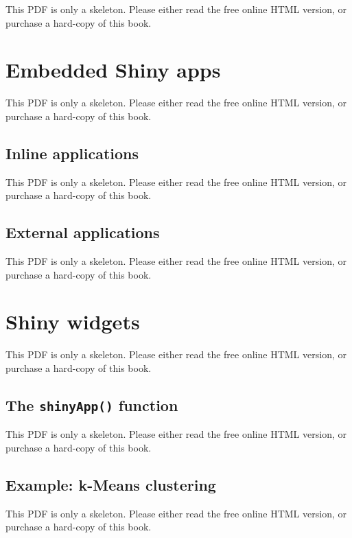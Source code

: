 \documentclass[
  11pt,
]{krantz}
\theoremstyle{definition}
\theoremstyle{definition}
\theoremstyle{definition}
\theoremstyle{definition}
\theoremstyle{remark}
\begin{document}
This PDF is only a skeleton. Please either read the free online HTML version, or purchase a hard-copy of this book.

\section{Embedded Shiny apps}\label{shiny-embedded}

This PDF is only a skeleton. Please either read the free online HTML version, or purchase a hard-copy of this book.

\subsection{Inline applications}\label{shiny-embed-inline}

This PDF is only a skeleton. Please either read the free online HTML version, or purchase a hard-copy of this book.

\subsection{External applications}\label{external-applications}

This PDF is only a skeleton. Please either read the free online HTML version, or purchase a hard-copy of this book.

\section{Shiny widgets}\label{shiny-widgets}

This PDF is only a skeleton. Please either read the free online HTML version, or purchase a hard-copy of this book.

\subsection{\texorpdfstring{The \texttt{shinyApp()} function}{The shinyApp() function}}\label{the-shinyapp-function}

This PDF is only a skeleton. Please either read the free online HTML version, or purchase a hard-copy of this book.

\subsection{Example: k-Means clustering}\label{example-k-means-clustering}

This PDF is only a skeleton. Please either read the free online HTML version, or purchase a hard-copy of this book.
\end{document}
